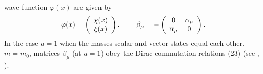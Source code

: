 \documentclass[a4paper,12pt]{article}
\begin{document}
wave function $\varphi (x)$ are given by
\begin{equation}
\varphi (x)=\left(
\begin{array}{c}
\chi (x) \\
\xi (x)
\end{array}
\right) ,\hspace{0.3in}\beta _\mu =-\left(
\begin{array}{cc}
0 & \alpha _\mu \\
\overline{\alpha }_\mu & 0
\end{array}
\right) . \label{31}
\end{equation}
In the case $a=1$ when the masses scalar and vector states equal
each other, $m=m_0$, matrices $\beta _\mu$ (at $a=1$) obey the
Dirac commutation relations (23) (see \cite{monogr},
\cite{Kruglov6}).
\end{document}
